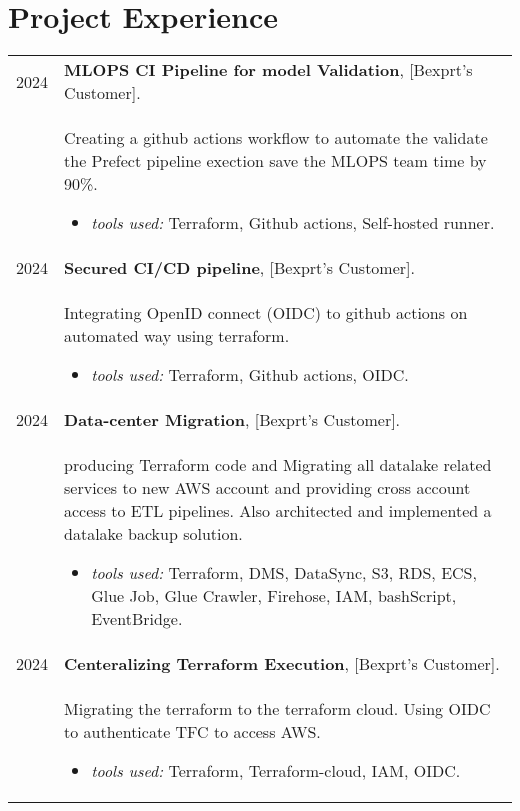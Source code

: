 \documentclass[a4paper,10pt]{article}
\begin{document}
\section{\textbf{Project Experience}}  
    \begin{longtable}{r p{16cm}}

        2024  & \textbf{MLOPS CI Pipeline for model Validation}, [Bexprt's Customer].\\&
        Creating a github actions workflow to automate the validate the Prefect pipeline exection save the MLOPS team time by 90\%.
        \begin{itemize}
            \item \textit{tools used: } Terraform, Github actions, Self-hosted runner.
        \end{itemize}\\
    
        2024  & \textbf{Secured CI/CD pipeline}, [Bexprt's Customer].\\&
        Integrating OpenID connect (OIDC) to github actions on automated way using terraform. 
        \begin{itemize}
            \item \textit{tools used: } Terraform, Github actions, OIDC.
        \end{itemize}\\

        2024  & \textbf{Data-center Migration}, [Bexprt's Customer].\\&
        producing Terraform code and Migrating all datalake related services to new AWS account and providing cross account access to ETL pipelines. Also architected and implemented a datalake backup solution.
        \begin{itemize}
            \item \textit{tools used: } Terraform, DMS, DataSync, S3, RDS, ECS, Glue Job, Glue Crawler, Firehose, IAM, bashScript, EventBridge.
        \end{itemize}\\
   
        2024  & \textbf{Centeralizing Terraform Execution}, [Bexprt's Customer].\\&
        Migrating the terraform to the terraform cloud. Using OIDC to authenticate TFC to access AWS.
        \begin{itemize}
            \item \textit{tools used: } Terraform, Terraform-cloud, IAM, OIDC.
        \end{itemize}\\
   


\end{longtable}
\end{document}

